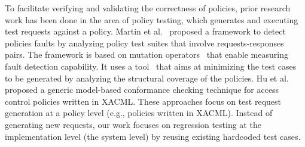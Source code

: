 
To facilitate verifying and validating the correctness of policies, prior
research work has been done in the area of policy testing, which generates and executing test requests against a policy.
Martin et al.~\cite{martin06:defining} proposed a framework to detect policies faults by analyzing
policy test suites that involve 
requests-responses pairs. The framework is based on mutation operators~\cite{martin07:fault} that enable measuring fault detection capability. 
It uses a tool~\cite {martin07:automated} that aims at minimizing the test cases to be generated by analyzing the structural coverage of the policies.
Hu et al.~\cite{hu07:conformance} proposed a generic model-based conformance checking technique for access control policies written in
XACML.
These approaches focus on test request generation at a policy level (e.g., policies written in XACML).
Instead of generating new requests, our work focuses on regression testing at the implementation level (the system level) by
reusing existing hardcoded test cases.



%
%

%

 


